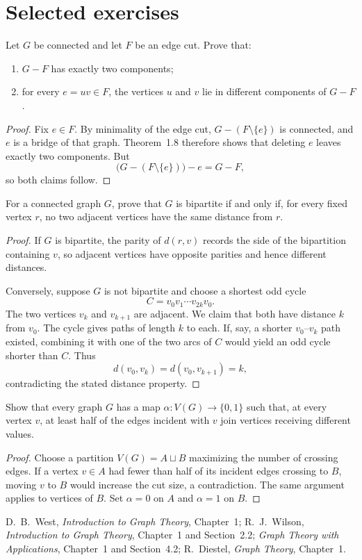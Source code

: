 \section{Selected exercises}

\begin{noteexercise}
Let $G$ be connected and let $F$ be an edge cut.  Prove that:
\begin{enumerate}
  \item $G-F$ has exactly two components;
  \item for every $e=uv\in F$, the vertices $u$ and $v$ lie in different components of $G-F$.
\end{enumerate}
\end{noteexercise}
\begin{proof}
Fix $e\in F$.  By minimality of the edge cut, $G-(F\setminus\{e\})$ is connected, and $e$ is a bridge of that graph.  Theorem~1.8 therefore shows that deleting $e$ leaves exactly two components.  But
\[
  \bigl(G-(F\setminus\{e\})\bigr)-e=G-F,
\]
so both claims follow.
\end{proof}
\begin{noteexercise}
For a connected graph $G$, prove that $G$ is bipartite if and only if, for every fixed vertex $r$, no two adjacent vertices have the same distance from $r$.
\end{noteexercise}
\begin{proof}
If $G$ is bipartite, the parity of $d(r,v)$ records the side of the bipartition containing $v$, so adjacent vertices have opposite parities and hence different distances.

Conversely, suppose $G$ is not bipartite and choose a shortest odd cycle
\[
  C=v_0v_1\cdots v_{2k}v_0.
\]
The two vertices $v_k$ and $v_{k+1}$ are adjacent.  We claim that both have distance $k$ from $v_0$.  The cycle gives paths of length $k$ to each.  If, say, a shorter $v_0$--$v_k$ path existed, combining it with one of the two arcs of $C$ would yield an odd cycle shorter than $C$.  Thus
\[
  d(v_0,v_k)=d(v_0,v_{k+1})=k,
\]
contradicting the stated distance property.
\end{proof}
\begin{noteexercise}
Show that every graph $G$ has a map $\alpha:V(G)\to\{0,1\}$ such that, at every vertex $v$, at least half of the edges incident with $v$ join vertices receiving different values.
\end{noteexercise}
\begin{proof}
Choose a partition $V(G)=A\sqcup B$ maximizing the number of crossing edges.  If a vertex $v\in A$ had fewer than half of its incident edges crossing to $B$, moving $v$ to $B$ would increase the cut size, a contradiction.  The same argument applies to vertices of $B$.  Set $\alpha=0$ on $A$ and $\alpha=1$ on $B$.
\end{proof}
\begin{noteremark}
D.~B.~West, \emph{Introduction to Graph Theory}, Chapter~1; R.~J.~Wilson, \emph{Introduction to Graph Theory}, Chapter~1 and Section~2.2; \emph{Graph Theory with Applications}, Chapter~1 and Section~4.2; R.~Diestel, \emph{Graph Theory}, Chapter~1.
\end{noteremark}
